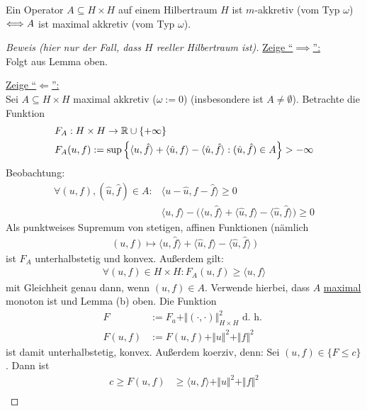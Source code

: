 \begin{theorem}[Minty]\enter
Ein Operator $A\subseteq H\times H$ auf einem Hilbertraum $H$ ist $m$-akkretiv (vom Typ $\omega$) $\Longleftrightarrow\\ A$ ist maximal akkretiv (vom Typ $\omega$).
\end{theorem}
\begin{proof}[Beweis (hier nur der Fall, dass $H$ reeller Hilbertraum ist)]\enter
\underline{Zeige ``$\implies$'':}\\
Folgt aus Lemma oben.\

\underline{Zeige ``$\Longleftarrow$'':}\\
Sei $A\subseteq H\times H$ maximal akkretiv ($\omega:=0$) (insbesondere ist $A\neq\emptyset$). Betrachte die Funktion 
\begin{align*}
&F_A:H\times H\to\mathbb{R}\cup\lbrace+\infty\rbrace\\
&F_A(u,f):=\sup\Big\lbrace\langle u,\hat{f}\rangle+\langle\hat{u},f\rangle-\langle\hat{u},\hat{f}\rangle:(\hat{u},\hat{f})\in A\Big\rbrace>-\infty
\end{align*}
Beobachtung: 
\begin{align*}
\forall (u,f),(\hat{u},\hat{f})\in A:
&\big\langle u-\hat{u},f-\hat{f}\big\rangle\geq0\\
&\langle u,f\rangle-\Big(\big\langle u,\hat{f}\big\rangle+\big\langle\hat{u},f\big\rangle-\big\langle\hat{u},\hat{f}\big\rangle\Big)\geq0
\end{align*}
Als punktweises Supremum von stetigen, affinen Funktionen (nämlich 
\begin{align*}
(u,f)\mapsto\big\langle u,\hat{f}\big\rangle+\big\langle\hat{u},f\big\rangle-\big\langle\hat{u},\hat{f}\big\rangle~\big)
\end{align*}
ist $F_A$ unterhalbstetig und konvex. Außerdem gilt:
\begin{align*}
\forall (u,f)\in H\times H:F_A(u,f)\geq\langle u,f\rangle
\end{align*}
mit Gleichheit genau dann, wenn $(u,f)\in A$. Verwende hierbei, dass $A$ \ul{maximal} monoton ist und Lemma (b) oben. Die Funktion
\begin{align*}
F&:=F_a+\Vert(\cdot,\cdot)\Vert^2_{H\times H}\text{ d. h. }\\
F(u,f)&:=F(u,f)+\Vert u\Vert^2+\Vert f\Vert^2
\end{align*}
ist damit unterhalbstetig, konvex. Außerdem koerziv, denn: Sei $(u,f)\in\lbrace F\leq c\rbrace$. Dann ist
\begin{align*}
c\geq F(u,f)
&\geq\langle u,f\rangle+\Vert u\Vert^2+\Vert f\Vert^2\\

\end{align*}
\end{proof}

